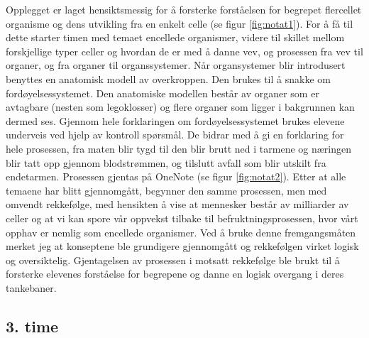 \documentclass[main.tex]{subfiles}
\begin{document}
Opplegget er laget hensiktsmessig for å forsterke forståelsen for begrepet flercellet organisme og dens utvikling fra 
en enkelt celle (se figur \ref{fig:notat1}). For å få til dette starter timen med temaet encellede organismer, 
videre til skillet mellom forskjellige typer celler og hvordan de er med å danne vev, og prosessen fra vev til
organer, og fra organer til organssystemer. Når organsystemer blir introdusert benyttes 
en anatomisk modell av overkroppen. Den brukes til å snakke om fordøyelsessystemet.
Den anatomiske modellen består av organer som er avtagbare (nesten som legoklosser) og flere organer 
som ligger i bakgrunnen kan dermed ses. Gjennom hele forklaringen om fordøyelsessystemet brukes
elevene underveis ved hjelp av kontroll spørsmål. De bidrar med å gi en forklaring for hele prosessen, 
fra maten blir tygd til den blir brutt ned i tarmene og næringen blir tatt opp gjennom blodstrømmen, 
og tilslutt avfall som blir utskilt fra endetarmen. Prosessen gjentas på OneNote (se figur \ref{fig:notat2}). 
Etter at alle temaene har blitt gjennomgått, begynner den samme prosessen, 
men med omvendt rekkefølge, med hensikten å vise at mennesker består av milliarder av celler og 
at vi kan spore vår oppvekst tilbake til befruktningsprosessen, hvor vårt opphav er nemlig som
encellede organismer. Ved å bruke denne fremgangsmåten merket jeg at konseptene ble grundigere
gjennomgått og rekkefølgen virket logisk og oversiktelig. Gjentagelsen av prosessen i motsatt
rekkefølge ble brukt til å forsterke elevenes forståelse for begrepene og danne en logisk 
overgang i deres tankebaner. 

\subsection*{3. time}
\end{document}
